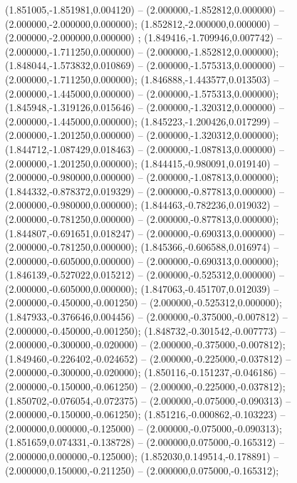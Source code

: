  (1.851005,-1.851981,0.004120) -- (2.000000,-1.852812,0.000000) -- (2.000000,-2.000000,0.000000);
 (1.852812,-2.000000,0.000000) -- (2.000000,-2.000000,0.000000) ;
 (1.849416,-1.709946,0.007742) -- (2.000000,-1.711250,0.000000) -- (2.000000,-1.852812,0.000000);
 (1.848044,-1.573832,0.010869) -- (2.000000,-1.575313,0.000000) -- (2.000000,-1.711250,0.000000);
 (1.846888,-1.443577,0.013503) -- (2.000000,-1.445000,0.000000) -- (2.000000,-1.575313,0.000000);
 (1.845948,-1.319126,0.015646) -- (2.000000,-1.320312,0.000000) -- (2.000000,-1.445000,0.000000);
 (1.845223,-1.200426,0.017299) -- (2.000000,-1.201250,0.000000) -- (2.000000,-1.320312,0.000000);
 (1.844712,-1.087429,0.018463) -- (2.000000,-1.087813,0.000000) -- (2.000000,-1.201250,0.000000);
 (1.844415,-0.980091,0.019140) -- (2.000000,-0.980000,0.000000) -- (2.000000,-1.087813,0.000000);
 (1.844332,-0.878372,0.019329) -- (2.000000,-0.877813,0.000000) -- (2.000000,-0.980000,0.000000);
 (1.844463,-0.782236,0.019032) -- (2.000000,-0.781250,0.000000) -- (2.000000,-0.877813,0.000000);
 (1.844807,-0.691651,0.018247) -- (2.000000,-0.690313,0.000000) -- (2.000000,-0.781250,0.000000);
 (1.845366,-0.606588,0.016974) -- (2.000000,-0.605000,0.000000) -- (2.000000,-0.690313,0.000000);
 (1.846139,-0.527022,0.015212) -- (2.000000,-0.525312,0.000000) -- (2.000000,-0.605000,0.000000);
 (1.847063,-0.451707,0.012039) -- (2.000000,-0.450000,-0.001250) -- (2.000000,-0.525312,0.000000);
 (1.847933,-0.376646,0.004456) -- (2.000000,-0.375000,-0.007812) -- (2.000000,-0.450000,-0.001250);
 (1.848732,-0.301542,-0.007773) -- (2.000000,-0.300000,-0.020000) -- (2.000000,-0.375000,-0.007812);
 (1.849460,-0.226402,-0.024652) -- (2.000000,-0.225000,-0.037812) -- (2.000000,-0.300000,-0.020000);
 (1.850116,-0.151237,-0.046186) -- (2.000000,-0.150000,-0.061250) -- (2.000000,-0.225000,-0.037812);
 (1.850702,-0.076054,-0.072375) -- (2.000000,-0.075000,-0.090313) -- (2.000000,-0.150000,-0.061250);
 (1.851216,-0.000862,-0.103223) -- (2.000000,0.000000,-0.125000) -- (2.000000,-0.075000,-0.090313);
 (1.851659,0.074331,-0.138728) -- (2.000000,0.075000,-0.165312) -- (2.000000,0.000000,-0.125000);
 (1.852030,0.149514,-0.178891) -- (2.000000,0.150000,-0.211250) -- (2.000000,0.075000,-0.165312);

